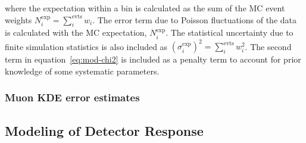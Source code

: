 \noindent where the expectation within a bin is calculated as the sum of the MC event weights $N^{\mathrm{exp}}_i = \sum_{i}^{\mathrm{evts}} w_i$. The error term due to Poisson fluctuations of the data is calculated with the MC expectation, $N^{\mathrm{exp}}_i$. The statistical uncertainty due to finite simulation statistics is also included as $(\sigma^{\mathrm{exp}}_i)^2 = \sum_{i}^{\mathrm{evts}} w_i^2$. The second term in equation~\ref{eq:mod-chi2} is included as a penalty term to account for prior knowledge of some systematic parameters. 


\subsubsection{Muon KDE error estimates}

\subsection{Modeling of Detector Response}
\label{sec:hypersurfaces}

